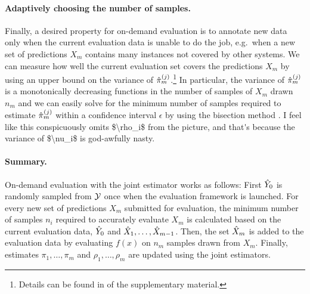 \paragraph{Adaptively choosing the number of samples.}
Finally, a desired property for on-demand evaluation is to annotate  new data  only when the current evaluation data  is unable to do the job, e.g.\ when a new set of predictions $X_m$ contains many instances not covered by other systems.
We can measure how well the current evaluation set covers the predictions $X_m$ by using an upper bound on the variance of ${\hat{\pi}}_m^{(j)}$.\footnote{Details can be found in  of the supplementary material.}
In particular, the variance of ${\hat{\pi}}_m^{(j)}$ is a monotonically decreasing functions in the number of samples of $X_m$ drawn $n_m$ and we can easily solve for the minimum number of samples required to estimate ${\hat{\pi}}_m^{(j)}$ within a confidence interval $\epsilon$ by using the bisection method \citep{burden1985bisection}. \ac{I feel like this conspicuously omits $\rho_i$ from the picture, and that's because the variance of $\nu_i$ is god-awfully nasty.}

\paragraph{Summary.}
On-demand evaluation with the joint estimator works as follows:
First ${\hat{Y}}_0$ is randomly sampled from $\mathcal{Y}$ once when the evaluation framework is launched.
For every new set of predictions $X_m$ submitted for evaluation, the minimum number of samples $n_i$ required to accurately evaluate $X_m$ is calculated based on the current evaluation data, ${\hat{Y}}_0$ and ${\hat{X}}_1, \ldots, {\hat{X}}_{m-1}$.
Then, the set ${\hat{X}}_m$ is added to the evaluation data by evaluating $f(x)$ on $n_m$ samples drawn from $X_m$.
Finally, estimates $\pi_1, \ldots, \pi_m$ and $\rho_1, \ldots, \rho_m$ are updated using the joint estimators.
